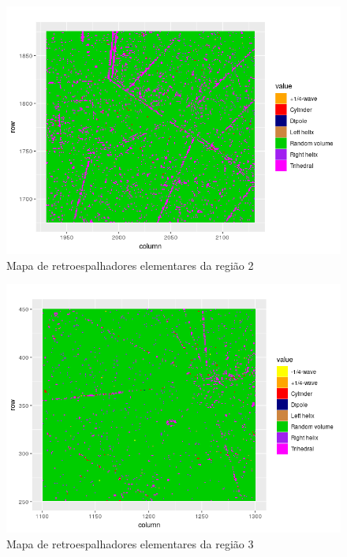 \documentclass[12pt]{article}
\begin{document}
\begin{figure}[!h]

  \centering
  \includegraphics[width=\linewidth]{../../Images/Report_19_02_27/scatterer_map_region2.png}
  \caption{Mapa de retroespalhadores elementares da região 2}
  \label{fig:scatterer_map2}

\end{figure}

\newpage

\begin{figure}[!h]

  \centering
  \includegraphics[width=\linewidth]{../../Images/Report_19_02_27/scatterer_map_region3.png}
  \caption{Mapa de retroespalhadores elementares da região 3}
  \label{fig:scatterer_map3}

\end{figure}
\end{document}
